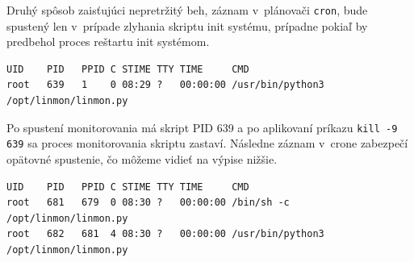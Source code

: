 Druhý spôsob zaisťujúci nepretržitý beh, záznam v~plánovači \texttt{cron}, bude spustený len v~prípade zlyhania skriptu init systému, prípadne pokiaľ by predbehol proces reštartu init systémom.

\begin{verbatim}
UID    PID   PPID C STIME TTY TIME     CMD
root   639   1    0 08:29 ?   00:00:00 /usr/bin/python3 /opt/linmon/linmon.py
\end{verbatim}

Po spustení monitorovania má skript PID 639 a  po aplikovaní príkazu \texttt{kill -9 639} sa proces monitorovania skriptu zastaví. Následne záznam v~crone zabezpečí opätovné spustenie, čo môžeme vidieť na výpise nižšie. 

\begin{verbatim}
UID    PID   PPID C STIME TTY TIME     CMD
root   681   679  0 08:30 ?   00:00:00 /bin/sh -c /opt/linmon/linmon.py
root   682   681  4 08:30 ?   00:00:00 /usr/bin/python3 /opt/linmon/linmon.py

\end{verbatim}

